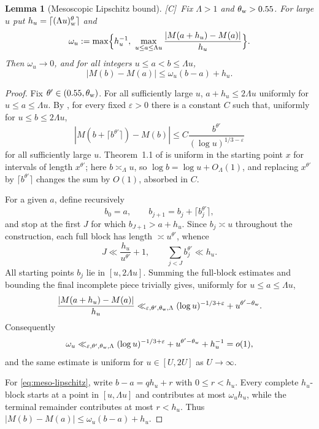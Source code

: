 \documentclass[11pt]{amsart}
\numberwithin{equation}{section}
\theoremstyle{plain}
\newtheorem{lemma}[theorem]{Lemma}
\theoremstyle{definition}
\theoremstyle{remark}
\newcommand{\tagC}{\textup{[C]}}
\begin{document}
\begin{lemma}[Mesoscopic Lipschitz bound]
\label{lem:meso-lipschitz}
\tagC\ Fix $\Lambda>1$ and $\theta_{\rm w}>0.55$. For large $u$ put
$h_u=\lceil(\Lambda u)^\theta_{\rm w}\rceil$ and
\[
\omega_u:=\max\Bigl\{h_u^{-1},\ \max_{u\le a\le\Lambda u}
\frac{|M(a+h_u)-M(a)|}{h_u}\Bigr\}.
\]
Then $\omega_u\to0$, and for all integers $u\le a<b\le\Lambda u$,
\begin{equation}
\label{eq:meso-lipschitz}
|M(b)-M(a)|\le\omega_u(b-a)+h_u .
\end{equation}
\end{lemma}

\begin{proof}
Fix $\theta'\in(0.55,\theta_{\rm w})$. For all sufficiently large $u$,
$a+h_u\le2\Lambda u$ uniformly for $u\le a\le\Lambda u$. By
\cite[Theorem~1.1]{MatomakiTeravainen2023}, for every fixed
$\varepsilon>0$ there is a constant $C$ such that, uniformly for
$u\le b\le2\Lambda u$,
\[
\left|M\!\left(b+\lceil b^{\theta'}\rceil\right)-M(b)\right|
\le C\frac{b^{\theta'}}{(\log u)^{1/3-\varepsilon}}
\]
for all sufficiently large $u$. Theorem~1.1 of
\cite{MatomakiTeravainen2023} is uniform in the starting point $x$ for
intervals of length $x^{\theta'}$; here $b\asymp_\Lambda u$, so
$\log b=\log u+O_\Lambda(1)$, and replacing $x^{\theta'}$ by
$\lceil b^{\theta'}\rceil$ changes the sum by $O(1)$, absorbed in $C$.

For a given $a$, define recursively
\[
 b_0=a,\qquad b_{j+1}=b_j+\lceil b_j^{\theta'}\rceil,
\]
and stop at the first $J$ for which $b_{J+1}>a+h_u$. Since
$b_j\asymp u$ throughout the construction, each full block has length
$\asymp u^{\theta'}$, whence
\[
 J\ll \frac{h_u}{u^{\theta'}}+1,
 \qquad
 \sum_{j<J}b_j^{\theta'}\ll h_u.
\]
All starting points $b_j$ lie in $[u,2\Lambda u]$. Summing the full-block
estimates and bounding the final incomplete piece trivially gives,
uniformly for $u\le a\le\Lambda u$,
\[
\frac{|M(a+h_u)-M(a)|}{h_u}
\ll_{\varepsilon,\theta',\theta_{\rm w},\Lambda}
(\log u)^{-1/3+\varepsilon}+u^{\theta'-\theta_{\rm w}}.
\]
Consequently
\begin{equation}
\label{eq:eta-uniform}
\omega_u\ll_{\varepsilon,\theta',\theta_{\rm w},\Lambda}
(\log u)^{-1/3+\varepsilon}+u^{\theta'-\theta_{\rm w}}+h_u^{-1}=o(1),
\end{equation}
and the same estimate is uniform for $u\in[U,2U]$ as $U\to\infty$.

For \eqref{eq:meso-lipschitz}, write $b-a=qh_u+r$ with $0\le r<h_u$.
Every complete $h_u$-block starts at a point in $[u,\Lambda u]$ and
contributes at most $\omega_u h_u$, while the terminal remainder contributes
at most $r<h_u$. Thus
$|M(b)-M(a)|\le\omega_u(b-a)+h_u$.
\end{proof}
\end{document}
